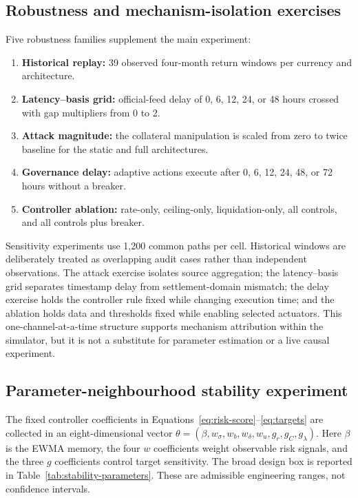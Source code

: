 \documentclass[sn-vancouver,Numbered]{sn-jnl}
\begin{document}
\subsection{Robustness and mechanism-isolation exercises}

Five robustness families supplement the main experiment:

\begin{enumerate}
  \item \textbf{Historical replay:} 39 observed four-month return windows per currency and architecture.
  \item \textbf{Latency--basis grid:} official-feed delay of 0, 6, 12, 24, or 48 hours crossed with gap multipliers from 0 to 2.
  \item \textbf{Attack magnitude:} the collateral manipulation is scaled from zero to twice baseline for the static and full architectures.
  \item \textbf{Governance delay:} adaptive actions execute after 0, 6, 12, 24, 48, or 72 hours without a breaker.
  \item \textbf{Controller ablation:} rate-only, ceiling-only, liquidation-only, all controls, and all controls plus breaker.
\end{enumerate}

Sensitivity experiments use 1,200 common paths per cell. Historical windows are deliberately treated as overlapping audit cases rather than independent observations. The attack exercise isolates source aggregation; the latency--basis grid separates timestamp delay from settlement-domain mismatch; the delay exercise holds the controller rule fixed while changing execution time; and the ablation holds data and thresholds fixed while enabling selected actuators. This one-channel-at-a-time structure supports mechanism attribution within the simulator, but it is not a substitute for parameter estimation or a live causal experiment.

\subsection{Parameter-neighbourhood stability experiment}

The fixed controller coefficients in Equations~\eqref{eq:risk-score}--\eqref{eq:targets}
are collected in an eight-dimensional vector
$\theta=(\beta,w_\sigma,w_b,w_\delta,w_u,g_r,g_C,g_\lambda)$.
Here $\beta$ is the EWMA memory, the four $w$ coefficients weight observable
risk signals, and the three $g$ coefficients control target sensitivity. The
broad design box is reported in Table~\ref{tab:stability-parameters}. These are
admissible engineering ranges, not confidence intervals.
\end{document}

